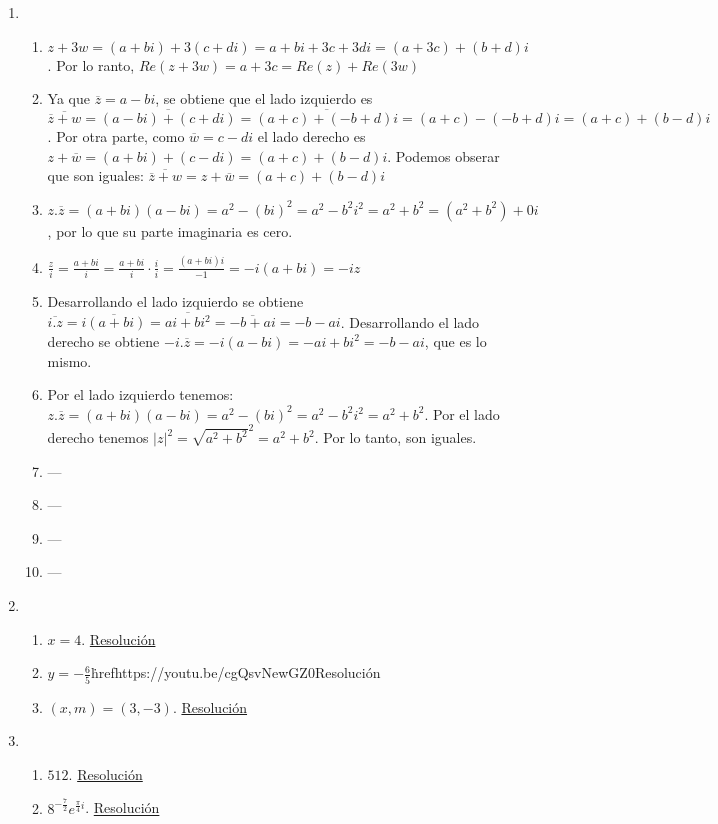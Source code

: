 \documentclass[a4paper]{article}
\newcommand{\exercise}{\item}
\newcommand{\df}[2]{\displaystyle\frac{#1}{#2}}
\newcommand{\conj}[1]{\overline{#1}}
\newcommand{\cis}[1]{\left[\cos\left({#1}\right)+i\sin\left({#1}\right)\right]}
\begin{document}
\begin{enumerate}
\begin{enumerate} [label=(\alph*)]
		\item $\cos\left(\df{\pi}{12}\right)+i\sin\left(\df{\pi}{12}\right)=e^{\frac{\pi}{12}} \simeq 0.9659 + 0.2588 i$
		\item $4e^{\frac{3\pi}{2}i}=4\cis{\df{3\pi}{2}}=0-4i$
\end{enumerate}\exercise\begin{enumerate} [label=(\alph*)]		\item $z+3w=(a+bi)+3(c+di)=a+bi+3c+3di=(a+3c)+(b+d)i$. Por lo ranto, $Re(z+3w)=a+3c=Re(z)+Re(3w)$
		\item Ya que $\conj{z}=a-bi$, se obtiene que el lado izquierdo es $\conj{\conj{z}+w}= \conj{(a-bi)+(c+di)} = \conj{(a+c)+(-b+d)i} = (a+c)-(-b+d)i = (a+c)+(b-d)i$. Por otra parte, como $\conj{w}=c-di$ el lado derecho es $z+\conj{w}=(a+bi)+(c-di)=(a+c)+(b-d)i$. Podemos obserar que son iguales: $\conj{\conj{z}+w}=z+\conj{w}=(a+c)+(b-d)i$
		\item $z.\conj{z}=(a+bi)(a-bi)=a^2-(bi)^2=a^2-b^2 i^2=a^2+b^2=(a^2+b^2)+0i$, por lo que su parte imaginaria es cero.
		\item $\df{z}{i}=\df{a+bi}{i}=\df{a+bi}{i}\cdot\df{i}{i}=\df{(a+bi)i}{-1}=-i(a+bi)=-iz$
		\item Desarrollando el lado izquierdo se obtiene $\conj{i.z}=\conj{i(a+bi)}=\conj{ai+bi^2}=\conj{-b+ai}=-b-ai$. Desarrollando el lado derecho se obtiene $-i.\conj{z}=-i(a-bi)=-ai+bi^2=-b-ai$, que es lo mismo.
		\item Por el lado izquierdo tenemos: $z.\conj{z}=(a+bi)(a-bi)=a^2-(bi)^2=a^2-b^2 i^2=a^2+b^2$. Por el lado derecho tenemos $|z|^2=\sqrt{a^2+b^2}^2=a^2+b^2$. Por lo tanto, son iguales.
\item ---\item ---\item ---\item ---\end{enumerate}\exercise\begin{enumerate} [label=(\alph*)]		\item $x=4$. \href{https://youtu.be/rZMja-gZ3q0}{Resolución}
		\item $y=-\df{6}{5}$\. href{https://youtu.be/cgQsvNewGZ0}{Resolución}
		\item $(x,m)=(3,-3)$. \href{https://youtu.be/kQmzdYU4EsY}{Resolución}
\end{enumerate}\exercise\begin{enumerate} [label=(\alph*)]		\item $512$. \href{https://youtu.be/bi_tVZZeAtY}{Resolución}
		\item $8^{-\frac{7}{2}} e^{\frac{\pi}{4}i}$. \href{https://youtu.be/5ET1IAoQNdc}{Resolución}

\end{enumerate}
\end{enumerate}
\end{document}
